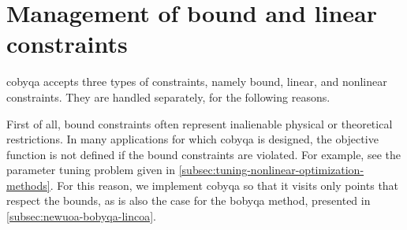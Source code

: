 \section{Management of bound and linear constraints}
\label{sec:simple-constraints}

\Gls{cobyqa} accepts three types of constraints, namely bound, linear, and nonlinear constraints.
They are handled separately, for the following reasons.

First of all, bound constraints often represent inalienable physical or theoretical restrictions.
In many applications for which \gls{cobyqa} is designed, the objective function is not defined if the bound constraints are violated.
For example, see the parameter tuning problem given in \cref{subsec:tuning-nonlinear-optimization-methods}.
For this reason, we implement \gls{cobyqa} so that it visits only points that respect the bounds, as is also the case for the \gls{bobyqa} method, presented in \cref{subsec:newuoa-bobyqa-lincoa}.


